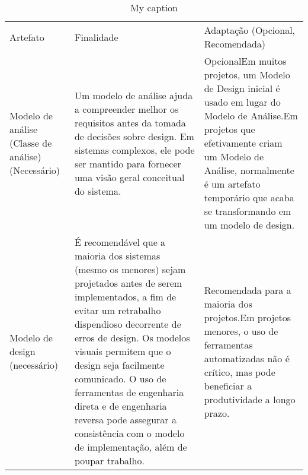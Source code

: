 \begin{table}[]
\centering
\caption{My caption}
\label{my-label}
\begin{tabular}{lll}
Artefato                                           & Finalidade                                                                                                                                                                                                                                                                                                                                                                                                        & Adaptação (Opcional, Recomendada)                                                                                                                                                                                                                                                                                                                                                \\
Modelo de análise (Classe de análise) (Necessário) & Um modelo de análise ajuda a compreender melhor os requisitos antes da tomada de decisões sobre design. Em sistemas complexos, ele pode ser mantido para fornecer uma visão geral conceitual do sistema.                                                                                                                                                                                                          & OpcionalEm muitos projetos, um Modelo de Design inicial é usado em lugar do Modelo de Análise.Em projetos que efetivamente criam um Modelo de Análise, normalmente é um artefato temporário que acaba se transformando em um modelo de design.                                                                                                                                   \\
Modelo de design (necessário)                      & É recomendável que a maioria dos sistemas (mesmo os menores) sejam projetados antes de serem implementados, a fim de evitar um retrabalho dispendioso decorrente de erros de design. Os modelos visuais permitem que o design seja facilmente comunicado. O uso de ferramentas de engenharia direta e de engenharia reversa pode assegurar a consistência com o modelo de implementação, além de poupar trabalho. & Recomendada para a maioria dos projetos.Em projetos menores, o uso de ferramentas automatizadas não é crítico, mas pode beneficiar a produtividade a longo prazo.                                                                                                                                                                                                                \\

\end{tabular}
\end{table}
